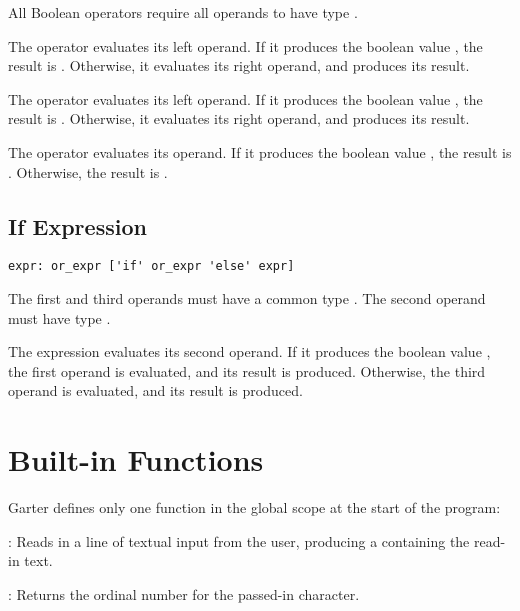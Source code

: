 All Boolean operators require all operands to have type .

The  operator evaluates its left operand. If it produces the boolean
value , the result is . Otherwise, it evaluates its
right operand, and produces its result.

The  operator evaluates its left operand. If it produces the boolean
value , the result is . Otherwise, it evaluates its
right operand, and produces its result.

The  operator evaluates its operand. If it produces the boolean value
, the result is . Otherwise, the result is .

\subsection{If Expression}
\begin{lstlisting}
expr: or_expr ['if' or_expr 'else' expr]
\end{lstlisting}

The first and third operands must have a common type . The second operand
must have type .

The  expression evaluates its second operand. If it produces the
boolean value , the first operand is evaluated, and its result is
produced. Otherwise, the third operand is evaluated, and its result is produced.

\section{Built-in Functions}
\label{sec:functions}

Garter defines only one function in the global scope at the start of the program:

: Reads in a line of textual input from the user, producing
a  containing the read-in text.

: Returns the ordinal number for the passed-in character.

